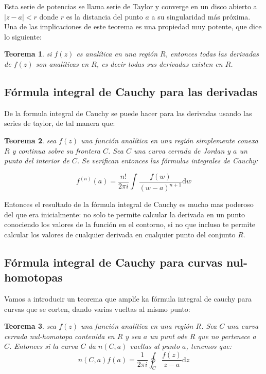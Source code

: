 \documentclass[12pt]{book}
\newcommand{\D}{\mathrm{d}}
\newtheorem{theorem}{Teorema}[section]
\begin{document}
Esta serie de potencias se llama serie de Taylor y converge en un disco abierto a $|z-a|<r$ donde $r$ es la distancia del punto $a$ a su singularidad más próxima. Una de las implicaciones de este teorema es una propiedad muy potente, que dice lo siguiente:

\begin{theorem}
si $f(z)$ es analítica en una región $R$, entonces todas las derivadas de $f(z)$ son analíticas en $R$, es decir todas sus derivadas existen en $R$. 
\end{theorem}


\subsection{Fórmula integral de Cauchy para las derivadas}

De la formula integral de Cauchy se puede hacer para las derivadas usando las series de taylor, de tal manera que:


\begin{theorem}
sea $f(z)$ una función analítica en una región simplemente conexa $R$ y continua sobre su frontera $C$. Sea $C$ una curva cerrada de Jordan y $a$ un punto del interior de $C$. Se verifican entonces las fórmulas integrales de Cauchy:

$$ f^{(n)} (a) = \frac{n!}{2 \pi i} \int \frac{f(w)}{(w-a)^{n+1}} \D w $$
\end{theorem}


Entonces el resultado de la fórmula integral de Cauchy es mucho mas poderoso del que era inicialmente: no solo te permite calcular la derivada en un punto conociendo los valores de la función en el contorno, si no que incluso te permite calcular los valores de cualquier derivada en cualquier punto del conjunto $R$.  

\subsection{Fórmula integral de Cauchy para curvas nul-homotopas}

Vamos a introducir un teorema que amplíe ka fórmula integral de cauchy para curvas que se corten, dando varias vueltas al mismo punto:

\begin{theorem}
sea $f(z)$ una función analítica en una región $R$. Sea $C$ una curva cerrada nul-homotopa contenida en $R$ y sea $a$ un punt ode $R$ que no pertenece a $C$. Entonces si la curva $C$ da $n(C,a)$ vueltas al punto $a$, tenemos que:
$$ n(C,a) f(a) = \frac{1}{2 \pi i} \oint_C \frac{f(z)}{z-a} \D z $$
\end{theorem}
\end{document}
